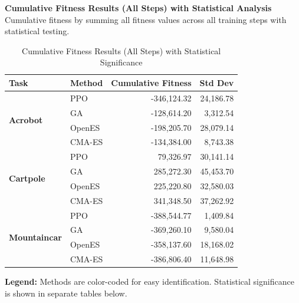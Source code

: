 \documentclass[12pt]{article}
\begin{document}
\begin{center}
\Large\textbf{Cumulative Fitness Results (All Steps) with Statistical Analysis}
\vspace{0.5cm}
\normalsize Cumulative fitness by summing all fitness values across all training steps with statistical testing.
\vspace{0.5cm}
\end{center}

\begin{table}[h!]
\centering
\caption{Cumulative Fitness Results (All Steps) with Statistical Significance}
\begin{tabular}{|l|l|r|r|}
\hline
\textbf{Task} & \textbf{Method} & \textbf{Cumulative Fitness} & \textbf{Std Dev} \\
\hline\hline
\multirow{4}{*}{\textbf{Acrobot}} & \rowcolor{ppo!20}PPO & -346,124.32 & 24,186.78 \\
\cline{2-4}
 & \rowcolor{ga!20}GA & -128,614.20 & 3,312.54 \\
\cline{2-4}
 & \rowcolor{openes!20}OpenES & -198,205.70 & 28,079.14 \\
\cline{2-4}
 & \rowcolor{cmaes!20}CMA-ES & -134,384.00 & 8,743.38 \\
\hline\hline
\multirow{4}{*}{\textbf{Cartpole}} & \rowcolor{ppo!20}PPO & 79,326.97 & 30,141.14 \\
\cline{2-4}
 & \rowcolor{ga!20}GA & 285,272.30 & 45,453.70 \\
\cline{2-4}
 & \rowcolor{openes!20}OpenES & 225,220.80 & 32,580.03 \\
\cline{2-4}
 & \rowcolor{cmaes!20}CMA-ES & 341,348.50 & 37,262.92 \\
\hline\hline
\multirow{4}{*}{\textbf{Mountaincar}} & \rowcolor{ppo!20}PPO & -388,544.77 & 1,409.84 \\
\cline{2-4}
 & \rowcolor{ga!20}GA & -369,260.10 & 9,580.04 \\
\cline{2-4}
 & \rowcolor{openes!20}OpenES & -358,137.60 & 18,168.02 \\
\cline{2-4}
 & \rowcolor{cmaes!20}CMA-ES & -386,806.40 & 11,648.98 \\
\hline
\end{tabular}
\end{table}

\begin{center}
\small
\textbf{Legend:} Methods are color-coded for easy identification. Statistical significance is shown in separate tables below.
\end{center}
\end{document}
